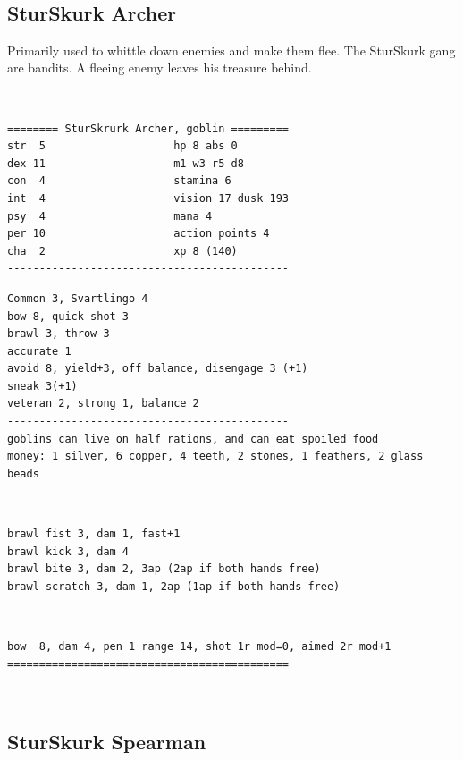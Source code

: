 \


\subsection*{SturSkurk Archer}

Primarily used to whittle down enemies and make them flee. The SturSkurk gang are bandits. A fleeing enemy leaves his treasure behind.

\

\goodbreak \small \begin{samepage} \begin{verbatim}
======== SturSkrurk Archer, goblin =========
str  5                    hp 8 abs 0
dex 11                    m1 w3 r5 d8
con  4                    stamina 6
int  4                    vision 17 dusk 193
psy  4                    mana 4
per 10                    action points 4
cha  2                    xp 8 (140)
--------------------------------------------
\end{verbatim} \goodbreak \begin{verbatim}
Common 3, Svartlingo 4
bow 8, quick shot 3
brawl 3, throw 3
accurate 1
avoid 8, yield+3, off balance, disengage 3 (+1)
sneak 3(+1)
veteran 2, strong 1, balance 2
--------------------------------------------
goblins can live on half rations, and can eat spoiled food
money: 1 silver, 6 copper, 4 teeth, 2 stones, 1 feathers, 2 glass beads
\end{verbatim} \begin{samepage}   \   \goodbreak \end{samepage} \begin{verbatim}
brawl fist 3, dam 1, fast+1
brawl kick 3, dam 4 
brawl bite 3, dam 2, 3ap (2ap if both hands free)
brawl scratch 3, dam 1, 2ap (1ap if both hands free)
\end{verbatim} \begin{samepage}   \   \goodbreak \end{samepage} \begin{verbatim}
bow  8, dam 4, pen 1 range 14, shot 1r mod=0, aimed 2r mod+1
============================================
\end{verbatim} \end{samepage} \normalsize

\


\subsection*{SturSkurk Spearman}

